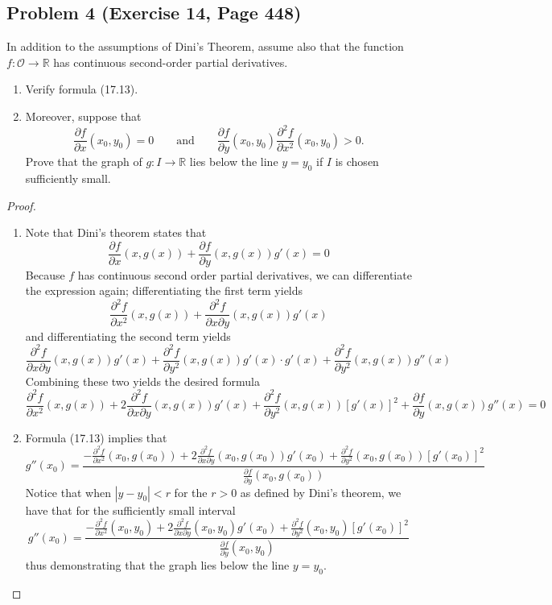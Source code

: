 \documentclass{article}
\begin{document}
\subsection*{Problem 4 (Exercise 14, Page 448)}
In addition to the assumptions of Dini's Theorem, assume also that the function $f \colon \mathcal{O} \to \mathbb{R}$ has continuous second-order partial derivatives.
\begin{enumerate}[label = \alph*.]
    \item Verify formula (17.13).
    \item Moreover, suppose that
    \[ \frac{\partial f}{\partial x} (x_0, y_0) = 0 \qquad \text{and} \qquad \frac{\partial f}{\partial y}(x_0, y_0) \frac{\partial^2 f}{\partial x^2}(x_0, y_0) > 0.\]
    Prove that the graph of $g \colon I \to \mathbb{R}$ lies below the line $y = y_0$ if $I$ is chosen sufficiently small. 
\end{enumerate}
\begin{proof}
\begin{enumerate}[label = \alph*.] 
    \item Note that Dini's theorem states that
    \[ \frac{\partial f}{\partial x}(x, g(x)) + \frac{\partial f}{\partial y}(x, g(x))g'(x) = 0 \]
    Because $f$ has continuous second order partial derivatives, we can differentiate the expression again; differentiating the first term yields 
    \[ \frac{\partial^2 f}{\partial x^2}(x, g(x)) + \frac{\partial^2 f}{\partial x \partial y}(x, g(x))g'(x)\]
    and differentiating the second term yields
    \[ \frac{\partial^2 f}{\partial x \partial y}(x, g(x))g'(x) + \frac{\partial^2 f}{\partial y^2}(x, g(x))g'(x) \cdot g'(x) + \frac{\partial^2 f}{\partial y^2}(x, g(x)) g''(x)\]
    Combining these two yields the desired formula
    \[ \frac{\partial^2 f}{\partial x^2}(x, g(x)) + 2\frac{\partial^2 f}{\partial x \partial y}(x, g(x))g'(x) + \frac{\partial^2 f}{\partial y^2}(x, g(x))[g'(x)]^2 + \frac{\partial f}{\partial y}(x, g(x))g''(x) = 0\]
    \item Formula (17.13) implies that 
    \[ g''(x_0) = \frac{-\frac{\partial^2 f}{\partial x^2}(x_0, g(x_0)) + 2\frac{\partial^2 f}{\partial x \partial y}(x_0, g(x_0))g'(x_0) + \frac{\partial^2 f}{\partial y^2}(x_0, g(x_0))[g'(x_0)]^2}{\frac{\partial f}{\partial y}(x_0, g(x_0))}\]
    Notice that when $|y - y_0| < r$ for the $r > 0$ as defined by Dini's theorem, we have that for the sufficiently small interval
    \[ g''(x_0) = \frac{-\frac{\partial^2 f}{\partial x^2}(x_0, y_0) + 2\frac{\partial^2 f}{\partial x \partial y}(x_0, y_0)g'(x_0) + \frac{\partial^2 f}{\partial y^2}(x_0, y_0)[g'(x_0)]^2}{\frac{\partial f}{\partial y}(x_0, y_0)}\]
    thus demonstrating that the graph lies below the line $y = y_0$.
\end{enumerate}
\end{proof}
\end{document}
